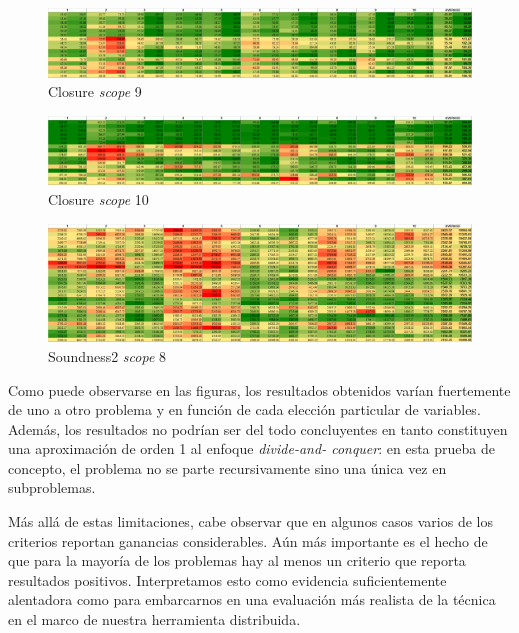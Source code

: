 \begin{figure}
	\includegraphics[width=\textwidth]{resultados/k9_percha.png}
	\caption{Closure \emph{scope} 9}
\end{figure}

\begin{figure}
	\includegraphics[width=\textwidth]{resultados/k10_percha.png}
	\caption{Closure \emph{scope} 10}
\end{figure}

\begin{figure}
	\includegraphics[width=\textwidth]{resultados/soundness8_percha.png}
	\caption{Soundness2 \emph{scope} 8}
	\label{perchasound8}
\end{figure}

Como puede observarse en las figuras, los resultados obtenidos varían
fuertemente de uno a otro problema y en función de cada elección particular de
variables. Además, los resultados no podrían ser del todo concluyentes en
tanto constituyen una aproximación de orden 1 al enfoque \emph{divide-and-
conquer}: en esta prueba de concepto, el problema no se parte recursivamente
sino una única vez en subproblemas.

Más allá de estas limitaciones, cabe observar que en algunos casos varios de
los criterios reportan ganancias considerables. Aún más importante es el hecho
de que para la mayoría de los problemas hay al menos un criterio que reporta
resultados positivos. Interpretamos esto como evidencia suficientemente
alentadora como para embarcarnos en una evaluación más realista de la técnica
en el marco de nuestra herramienta distribuida.

